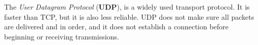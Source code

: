 The \textit{User Datagram Protocol} (\textbf{UDP}), is a widely used transport protocol. It is faster than TCP, but it is also less reliable. UDP does not make sure all packets are delivered and in order, and it does not establish a connection before beginning or receiving transmissions.
